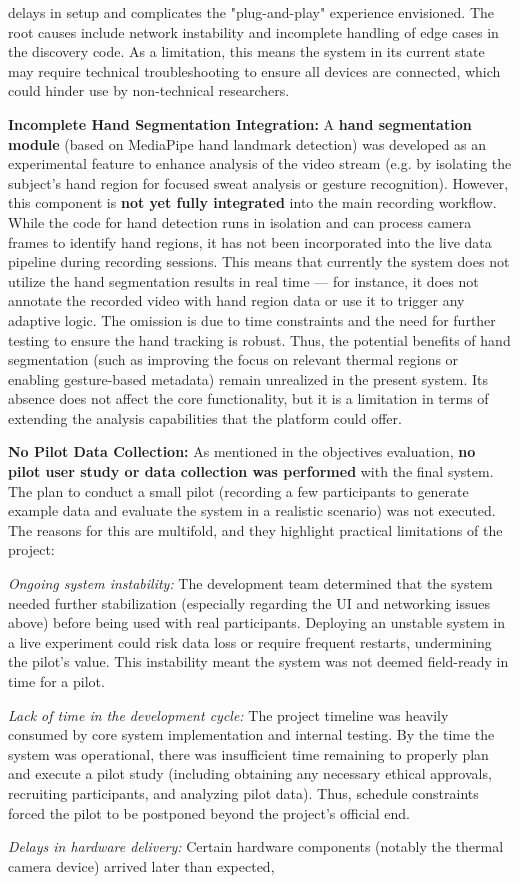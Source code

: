 delays in setup and complicates the "plug-and-play" experience envisioned. The root causes include network instability and incomplete handling of edge cases in the discovery code. As a limitation, this means the system in its current state may require technical troubleshooting to ensure all devices are connected, which could hinder use by non-technical researchers. \item \textbf{Incomplete Hand Segmentation Integration:} A \textbf{hand segmentation module} (based on MediaPipe hand landmark detection) was developed as an experimental feature to enhance analysis of the video stream (e.g. by isolating the subject's hand region for focused sweat analysis or gesture recognition). However, this component is \textbf{not yet fully integrated} into the main recording workflow. While the code for hand detection runs in isolation and can process camera frames to identify hand regions, it has not been incorporated into the live data pipeline during recording sessions. This means that currently the system does not utilize the hand segmentation results in real time --- for instance, it does not annotate the recorded video with hand region data or use it to trigger any adaptive logic. The omission is due to time constraints and the need for further testing to ensure the hand tracking is robust. Thus, the potential benefits of hand segmentation (such as improving the focus on relevant thermal regions or enabling gesture-based metadata) remain unrealized in the present system. Its absence does not affect the core functionality, but it is a limitation in terms of extending the analysis capabilities that the platform could offer. \item \textbf{No Pilot Data Collection:} As mentioned in the objectives evaluation, \textbf{no pilot user study or data collection was performed} with the final system. The plan to conduct a small pilot (recording a few participants to generate example data and evaluate the system in a realistic scenario) was not executed. The reasons for this are multifold, and they highlight practical limitations of the project: \item \textit{Ongoing system instability:} The development team determined that the system needed further stabilization (especially regarding the UI and networking issues above) before being used with real participants. Deploying an unstable system in a live experiment could risk data loss or require frequent restarts, undermining the pilot's value. This instability meant the system was not deemed field-ready in time for a pilot. \item \textit{Lack of time in the development cycle:} The project timeline was heavily consumed by core system implementation and internal testing. By the time the system was operational, there was insufficient time remaining to properly plan and execute a pilot study (including obtaining any necessary ethical approvals, recruiting participants, and analyzing pilot data). Thus, schedule constraints forced the pilot to be postponed beyond the project's official end. \item \textit{Delays in hardware delivery:} Certain hardware components (notably the thermal camera device) arrived later than expected, 